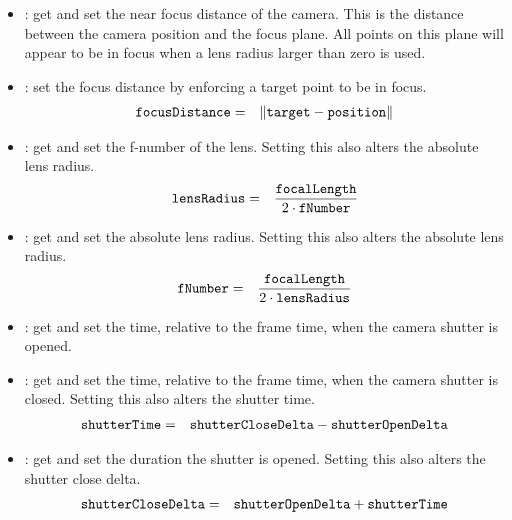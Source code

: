 \begin{itemize}
	\item {}:
 	  get and set the near focus distance of the camera.  This is the distance between the camera position and the focus plane.  All points on this plane will appear to be in focus when a lens radius larger than zero is used.
 	  
	\item {}:
 	  set the focus distance by enforcing a target point to be in focus.
	  \begin{eqnarray}
	  	\kw{focusDistance} &=& \left\|\kw{target} - \kw{position}\right\|
	  \end{eqnarray}
		
 	\item {}:
 	  get and set the f-number of the lens.  Setting this also alters the absolute lens radius.
	  \begin{eqnarray}
	  	\kw{lensRadius} &=& \frac{\kw{focalLength}}{2 \cdot \kw{fNumber}}
	  \end{eqnarray}
		
 	\item {}:
 	  get and set the absolute lens radius.  Setting this also alters the absolute lens radius.
	  \begin{eqnarray}
	  	\kw{fNumber} &=& \frac{\kw{focalLength}}{2 \cdot \kw{lensRadius}}
	  \end{eqnarray}
		
 	\item {}:
 	  get and set the time, relative to the frame time, when the camera shutter is opened.
		
 	\item {}:
 	  get and set the time, relative to the frame time, when the camera shutter is closed.  Setting this also alters the shutter time.
	  \begin{eqnarray}
	  	\kw{shutterTime} &=& \kw{shutterCloseDelta} - \kw{shutterOpenDelta}
	  \end{eqnarray}
		
 	\item {}:
 	  get and set the duration the shutter is opened.  Setting this also alters the shutter close delta.
	  \begin{eqnarray}
	  	\kw{shutterCloseDelta} &=& \kw{shutterOpenDelta} + \kw{shutterTime}
	  \end{eqnarray}
	  
	 

\end{itemize}
